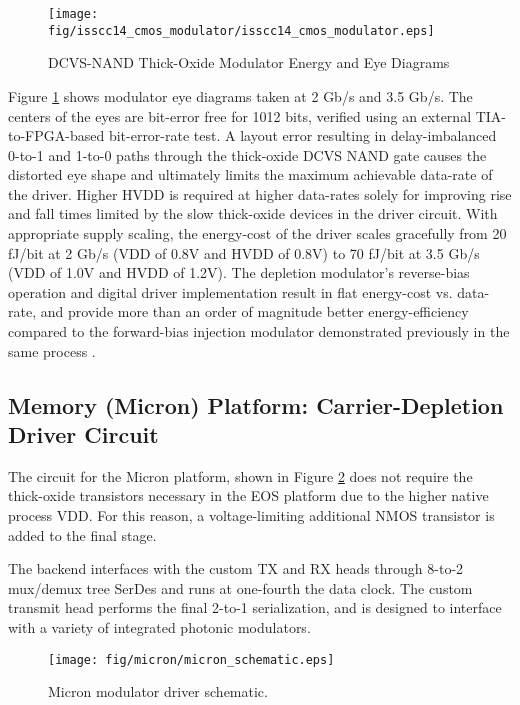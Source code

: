 	\begin{figure}[H]
		\begin{center}
			\texttt{[image: fig/isscc14\_cmos\_modulator/isscc14\_cmos\_modulator.eps]}
			\caption{\label{fig:isscc14_cmos_modulator} DCVS-NAND Thick-Oxide Modulator Energy and Eye Diagrams}
		\end{center}
	\end{figure}


Figure \ref{fig:isscc14_cmos_modulator} shows modulator eye diagrams taken at 2 Gb/s and 3.5 Gb/s. The centers of the eyes are bit-error free for 1012 bits, verified using an external TIA-to-FPGA-based bit-error-rate test. A layout error resulting in delay-imbalanced 0-to-1 and 1-to-0 paths through the thick-oxide DCVS NAND gate causes the distorted eye shape and ultimately limits the maximum achievable data-rate of the driver. Higher HVDD is required at higher data-rates solely for improving rise and fall times limited by the slow thick-oxide devices in the driver circuit. With appropriate supply scaling, the energy-cost of the driver scales gracefully from 20 fJ/bit at 2 Gb/s (VDD of 0.8V and HVDD of 0.8V) to 70 fJ/bit at 3.5 Gb/s (VDD of 1.0V and HVDD of 1.2V). The depletion modulator's reverse-bias operation and digital driver implementation result in flat energy-cost vs. data-rate, and provide more than an order of magnitude better energy-efficiency compared to the forward-bias injection modulator demonstrated previously in the same process \cite{moss_isscc13}. 


\subsection{Memory (Micron) Platform: Carrier-Depletion Driver Circuit}
The circuit for the Micron platform, shown in Figure \ref{fig:micron_schematic} does not require the thick-oxide transistors necessary in the EOS platform due to the higher native process VDD.  For this reason, a voltage-limiting additional NMOS transistor is added to the final stage.

The backend interfaces with the custom TX and RX heads through 8-to-2 mux/demux tree SerDes and runs at one-fourth the data clock. The custom transmit head performs the final 2-to-1 serialization, and is designed to interface with a variety of integrated photonic modulators.

	\begin{figure}[H]
		\begin{center}
			\texttt{[image: fig/micron/micron\_schematic.eps]}
			\caption{\label{fig:micron_schematic} Micron modulator driver schematic.}
		\end{center}
	\end{figure}


